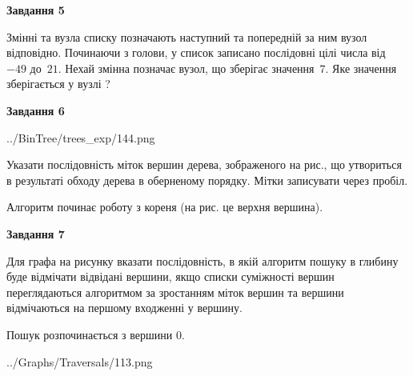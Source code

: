 \documentclass[12pt, ukrainian]{article}
\begin{document}
{\begin {large}
{\begin {center}\textbf{Завдання 5}\end {center}}\par
Змінні  та  вузла списку позначають наступний та попередній за ним вузол відповідно. Починаючи з голови, у список записано послідовні цілі числа від~$-49$ до~$21$. Нехай змінна  позначає вузол, що зберігає значення~$7$.
Яке значення зберігається у вузлі  ?\par
\newpage

{\begin {center}\textbf{Завдання 6}\end {center}}\par

\begin{center}
	{../BinTree/trees_exp/144.png}
\end{center}
Указати послідовність міток вершин дерева, зображеного на рис., що утвориться в результаті обходу дерева в оберненому порядку. Мітки записувати через пробіл.\par Алгоритм починає роботу з кореня (на рис. це верхня вершина).\par
\newpage

{\begin {center}\textbf{Завдання 7}\end {center}}\par
Для графа на рисунку вказати послідовність, в якій алгоритм пошуку в глибину буде відмічати відвідані вершини, якщо списки суміжності вершин переглядаються алгоритмом за зростанням міток вершин та вершини відмічаються на першому вход\-женні у вершину.\par
Пошук розпочинається з вершини 0.\par

\begin{center}
	{../Graphs/Traversals/113.png}
\end{center}\par
\newpage


\end{large}}
\end{document}
